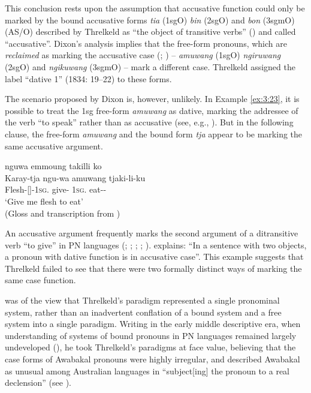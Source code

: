 This conclusion rests upon the assumption that accusative function could only be marked by the bound accusative forms \textit{tia} (1sgO) \textit{bin} (2sgO) and \textit{bon} (3sgmO) (AS/O) described by Threlkeld as “the object of transitive verbs” (\citeyear[20]{threlkeld_australian_1834}) and called ``accusative''. Dixon’s analysis implies that the free-form pronouns, which are \textit{reclaimed} as marking the accusative case (\citealt{oppliger_phonology_1984}; \citealt{lissarrague_salvage_2006}) – \textit{amuwang} (1sgO) \textit{ngiruwang} (2sgO) and \textit{ngikuwang} (3sgmO) – mark a different case. Threlkeld assigned the label “dative 1” (1834: 19--22) to these forms. 

The scenario proposed by Dixon is, however, unlikely. In Example \ref{ex:3:23}, it is possible to treat the 1sg free-form \textit{amuwang} as dative, marking the addressee of the verb “to speak” rather than as accusative (see, e.g., \citealt[179]{wilkins_mparntwe_1989}). But in the following clause, the free-form \textit{amuwang} and the bound form \textit{tja} appear to be marking the same accusative argument.

\ea\label{ex:3:24}
      		 nguwa   	 emmoung    	 {takilli ko} \\
Karay-tja  		 ngu-wa  	 amuwang             tjaki-li-ku \\
Flesh-[]-1\textsc{sg}.	 give- 	1\textsc{sg}.		 eat-- \\
\glt `Give me flesh to eat' \\
(Gloss and transcription from \citealt[42]{lissarrague_salvage_2006})
\z

An accusative argument frequently marks the second argument of a ditransitive verb “to give” in PN languages (\citealt[35--36]{blake_case_1977}; \citealt[2]{schebeck_adnjamathanha_1973}; \citealt[169]{wilkins_mparntwe_1989}; \citealt[294]{henderson_topics_2013}; \citealt[75]{hercus_grammar_1999}). \citet[42]{lissarrague_salvage_2006} explains: “In a sentence with two objects, a pronoun with dative function is in accusative case”. This example suggests that Threlkeld failed to see that there were two formally distinct ways of marking the same case function. 

\citet[56]{capell_structure_1937} was of the view that Threlkeld’s paradigm represented a single pronominal system, rather than an inadvertent conflation of a bound system and a free system into a single paradigm. Writing in the early middle descriptive era, when understanding of systems of bound pronouns in PN languages remained largely undeveloped (), he took Threlkeld’s paradigms at face value, believing that the case forms of Awabakal pronouns were highly irregular, and described Awabakal as unusual among Australian languages in “subject[ing] the pronoun to a real declension” (see ).

